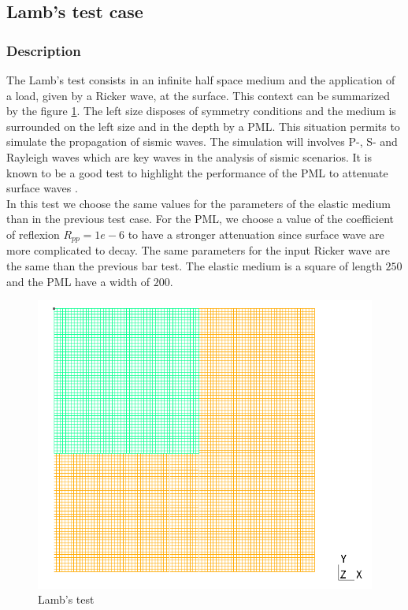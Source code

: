\subsection{Lamb's test case}
\subsubsection{Description}
The Lamb's test consists in an infinite half space medium and the application of a load, given by a Ricker wave, at the surface. This context can be summarized by the figure \ref{fig:Lamb_test}. The left size disposes of symmetry conditions and the medium is surrounded on the left size and in the depth by a PML. This situation permits to simulate the propagation of sismic waves. The simulation will involves P-, S- and Rayleigh waves which are key waves in the analysis of sismic scenarios. It is known to be a good test to highlight the performance of the PML to attenuate surface waves \cite{Liu2006}. \\
In this test we choose the same values for the parameters of the elastic medium than in the previous test case. For the PML, we choose a value of the coefficient of reflexion $R_{pp} = 1e-6$ to have a stronger attenuation since surface wave are more complicated to decay. The same parameters for the input Ricker wave are the same than the previous bar test. The elastic medium is a square of length $250$ and the PML have a width of $200$.
\begin{figure}[H]
  \centering
  \includegraphics[scale=0.4]{images/Lamb_test.png}
  \caption{Lamb's test}
  \label{fig:Lamb_test}
\end{figure}    

